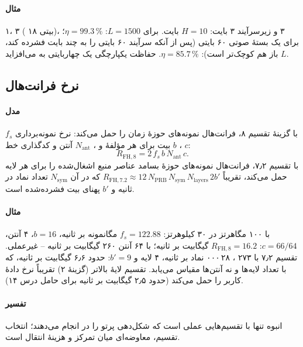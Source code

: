 \documentclass[11pt,a4paper]{article}
\begin{document}
\paragraph{مثال}  ۱،  ۳ ( ۱۸ بیتی)،  ۳ و زیرسرآیند  ۳ بایت: $H = 10$ بایت. برای $L = 1500$:
$\eta = 99.3\,\%$؛ برای یک بستهٔ صوتی ۶۰ بایتی (پس از آنکه  سرآیند ۶۰ بایتی  را به چند بایت فشرده کند، $L$ باز هم
کوچک‌تر است): $\eta = 85.7\,\%$. حفاظت یکپارچگی یک  چهاربایتی به  می‌افزاید.

\subsection{نرخ فرانت‌هال}\label{sec:fh}
\paragraph{مدل} با گزینهٔ تقسیم ۸، فرانت‌هال نمونه‌های  حوزهٔ زمان را حمل می‌کند: نرخ نمونه‌برداری $f_s$، $b$ بیت برای هر مؤلفهٔ
 و ، $N_{\mathrm{ant}}$ آنتن و کدگذاری خط $c$:
\begin{equation}\label{eq:cpri}
  R_{\mathrm{FH},8} = 2\, f_s\, b\, N_{\mathrm{ant}}\, c .
\end{equation}
با تقسیم ۷٫۲، فرانت‌هال نمونه‌های حوزهٔ بسامد عناصر منبع اشغال‌شده را برای هر لایه حمل می‌کند، تقریباً
$R_{\mathrm{FH},7.2} \approx 12\,N_{\mathrm{PRB}}\,N_{\mathrm{sym}}\,N_{\mathrm{layers}}\,2b'$ که در آن $N_{\mathrm{sym}}$ تعداد نماد در ثانیه و $b'$
پهنای بیت فشرده‌شده است.
\paragraph{مثال}  با ۱۰۰ مگاهرتز در ۳۰ کیلوهرتز: $f_s = 122.88$ مگانمونه بر ثانیه، $b = 16$، ۴ آنتن، $c = 66/64$:
$R_{\mathrm{FH},8} = 16.2$ گیگابیت بر ثانیه؛ با ۶۴ آنتن ۲۶۰ گیگابیت بر ثانیه -- غیرعملی. تقسیم ۷٫۲ با ۲۷۳ ، ۲۸\,۰۰۰ نماد بر ثانیه، ۴ لایه و
$b' = 9$: حدود ۶٫۶ گیگابیت بر ثانیه، که با تعداد لایه‌ها و نه آنتن‌ها مقیاس می‌یابد. تقسیم لایهٔ بالاتر (گزینهٔ ۲) تقریباً نرخ دادهٔ کاربر را
حمل می‌کند (حدود ۲٫۵ گیگابیت بر ثانیه برای حامل درس ۱۴).
\paragraph{تفسیر}  انبوه تنها با تقسیم‌هایی عملی است که شکل‌دهی پرتو را در  انجام می‌دهند؛ انتخاب تقسیم، معاوضه‌ای میان
تمرکز و هزینهٔ انتقال است.
\end{document}
